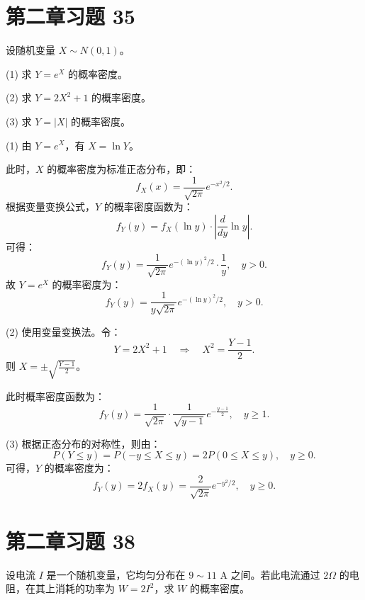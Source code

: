 \documentclass[twoside]{article}
\begin{document}
\section{第二章习题 35}

设随机变量 $X \sim N(0,1)$。

(1) 求 $Y = e^X$ 的概率密度。

(2) 求 $Y = 2X^2 + 1$ 的概率密度。

(3) 求 $Y = |X|$ 的概率密度。

\begin{ans}{35}{35}

(1)
由 $Y = e^X$，有 $X = \ln Y$。

此时，$X$ 的概率密度为标准正态分布，即：
\[
f_X(x) = \frac{1}{\sqrt{2\pi}} e^{-x^2 / 2}.
\]
根据变量变换公式，$Y$ 的概率密度函数为：
\[
f_Y(y) = f_X(\ln y) \cdot \left| \frac{d}{dy} \ln y \right|.
\]
可得：
\[
f_Y(y) = \frac{1}{\sqrt{2\pi}} e^{-(\ln y)^2 / 2} \cdot \frac{1}{y}, \quad y > 0.
\]
故 $Y = e^X$ 的概率密度为：
\[
f_Y(y) = \frac{1}{y \sqrt{2\pi}} e^{-(\ln y)^2 / 2}, \quad y > 0.
\]

(2)
使用变量变换法。令：
\[
Y = 2X^2 + 1 \quad \Rightarrow \quad X^2 = \frac{Y - 1}{2}.
\]
则 $X = \pm \sqrt{\frac{Y - 1}{2}}$。

此时概率密度函数为：
\[
f_Y(y) = \frac{1}{\sqrt{2\pi}} \cdot \frac{1}{\sqrt{y - 1}} e^{-\frac{y - 1}{2}}, \quad y \geq 1.
\]

(3)
根据正态分布的对称性，则由：
\[
P(Y \leq y) = P(-y \leq X \leq y) = 2P(0 \leq X \leq y), \quad y \geq 0.
\]
可得，$Y$ 的概率密度为：
\[
f_Y(y) = 2f_X(y) = \frac{2}{\sqrt{2\pi}} e^{-y^2 / 2}, \quad y \geq 0.
\]

\end{ans}

\section{第二章习题 38}

设电流 $I$ 是一个随机变量，它均匀分布在 $9 \sim 11$ A 之间。若此电流通过 $2 \Omega$ 的电阻，在其上消耗的功率为 $W = 2I^2$，求 $W$ 的概率密度。

\begin{ans}{38}{38}


\end{ans}
\end{document}
